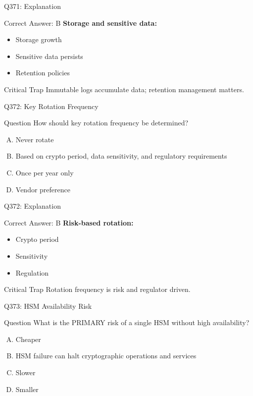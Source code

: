 \documentclass{beamer}
\begin{document}
	\begin{frame}{Q371: Explanation}
		\begin{block}{Correct Answer: B}
			\textbf{Storage and sensitive data:}
			\begin{itemize}
				\item Storage growth
				\item Sensitive data persists
				\item Retention policies
			\end{itemize}
		\end{block}
		\begin{alertblock}{Critical Trap}
			Immutable logs accumulate data; retention management matters.
		\end{alertblock}
	\end{frame}
	
	\begin{frame}{Q372: Key Rotation Frequency}
		\begin{block}{Question}
			How should key rotation frequency be determined?
		\end{block}
		\begin{enumerate}[(A)]
			\item Never rotate
			\item Based on crypto period, data sensitivity, and regulatory requirements
			\item Once per year only
			\item Vendor preference
		\end{enumerate}
	\end{frame}
	
	\begin{frame}{Q372: Explanation}
		\begin{block}{Correct Answer: B}
			\textbf{Risk-based rotation:}
			\begin{itemize}
				\item Crypto period
				\item Sensitivity
				\item Regulation
			\end{itemize}
		\end{block}
		\begin{alertblock}{Critical Trap}
			Rotation frequency is risk and regulator driven.
		\end{alertblock}
	\end{frame}
	
	\begin{frame}{Q373: HSM Availability Risk}
		\begin{block}{Question}
			What is the PRIMARY risk of a single HSM without high availability?
		\end{block}
		\begin{enumerate}[(A)]
			\item Cheaper
			\item HSM failure can halt cryptographic operations and services
			\item Slower
			\item Smaller
		\end{enumerate}
	\end{frame}
	
\end{document}
